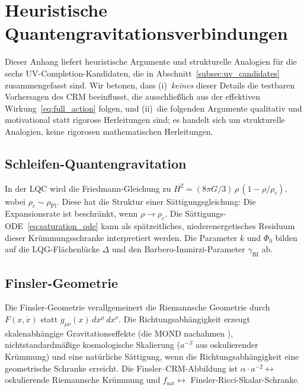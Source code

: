 \documentclass[11pt,a4paper]{article}
\begin{document}
\appendix
\section{Heuristische Quantengravitationsverbindungen}
\label{app:qg_details}

Dieser Anhang liefert heuristische Argumente und strukturelle Analogien f\"ur die sechs UV-Completion-Kandidaten, die in Abschnitt~\ref{subsec:uv_candidates} zusammengefasst sind. Wir betonen, dass (i)~\textit{keines} dieser Details die testbaren Vorhersagen des CRM beeinflusst, die ausschlie\ss lich aus der effektiven Wirkung~\eqref{eq:full_action} folgen, und (ii)~die folgenden Argumente qualitativ und motivational statt rigorose Herleitungen sind; es handelt sich um strukturelle Analogien, keine rigorosen mathematischen Herleitungen.

\subsection{Schleifen-Quantengravitation}
In der LQC \cite{Ashtekar2011} wird die Friedmann-Gleichung zu $H^2 = (8\pi G/3)\,\rho\,(1 - \rho/\rho_c)$, wobei $\rho_c \sim \rho_{\mathrm{Pl}}$. Diese hat die Struktur einer S\"attigungsgleichung: Die Expansionsrate ist beschr\"ankt, wenn $\rho \to \rho_c$. Die S\"attigungs-ODE~\eqref{eq:saturation_ode} kann als sp\"atzeitliches, niederenergetisches Residuum dieser Kr\"ummungsschranke interpretiert werden. Die Parameter $k$ und $\Phi_0$ bilden auf die LQG-Fl\"achenl\"ucke $\Delta$ und den Barbero-Immirzi-Parameter $\gamma_{\mathrm{BI}}$ ab.

\subsection{Finsler-Geometrie}
Die Finsler-Geometrie \cite{Bao2000} verallgemeinert die Riemannsche Geometrie durch $F(x, \dot{x})$ statt $g_{\mu\nu}(x)\,dx^\mu\,dx^\nu$. Die Richtungsabh\"angigkeit erzeugt skalenabh\"angige Gravitationseffekte (die MOND nachahmen \cite{Chang2009}), nichtstandardm\"a\ss ige kosmologische Skalierung ($a^{-\beta}$ aus oskulierender Kr\"ummung) und eine nat\"urliche S\"attigung, wenn die Richtungsabh\"angigkeit eine geometrische Schranke erreicht. Die Finsler--CRM-Abbildung ist $\alpha \cdot a^{-2} \leftrightarrow$ oskulierende Riemannsche Kr\"ummung und $f_{\mathrm{sat}} \leftrightarrow$ Finsler-Ricci-Skalar-Schranke.
\end{document}
